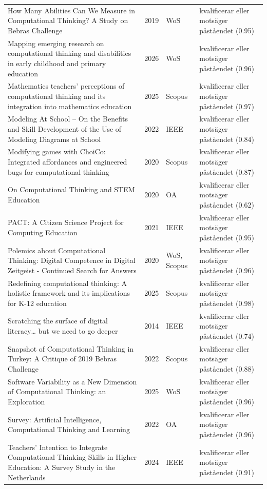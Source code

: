 \begin{longtable}{@{}%
  >{\raggedright\arraybackslash}p{}c%
  >{\raggedright\arraybackslash}p{}%
  >{\raggedright\arraybackslash}p{}@{}}
How Many Abilities Can We Measure in Computational Thinking? A Study on Bebras Challenge & 2019 & WoS & kvalificerar eller motsäger påståendet (0.95) \\
Mapping emerging research on computational thinking and disabilities in early childhood and primary education & 2026 & WoS & kvalificerar eller motsäger påståendet (0.96) \\
Mathematics teachers' perceptions of computational thinking and its integration into mathematics education & 2025 & Scopus & kvalificerar eller motsäger påståendet (0.97) \\
Modeling At School -- On the Benefits and Skill Development of the Use of Modeling Diagrams at School & 2022 & IEEE & kvalificerar eller motsäger påståendet (0.84) \\
Modifying games with ChoiCo: Integrated affordances and engineered bugs for computational thinking & 2020 & Scopus & kvalificerar eller motsäger påståendet (0.87) \\
On Computational Thinking and STEM Education & 2020 & OA & kvalificerar eller motsäger påståendet (0.62) \\
PACT: A Citizen Science Project for Computing Education & 2021 & IEEE & kvalificerar eller motsäger påståendet (0.95) \\
Polemics about Computational Thinking: Digital Competence in Digital Zeitgeist - Continued Search for Answers & 2020 & WoS, Scopus & kvalificerar eller motsäger påståendet (0.96) \\
Redefining computational thinking: A holistic framework and its implications for K-12 education & 2025 & Scopus & kvalificerar eller motsäger påståendet (0.98) \\
Scratching the surface of digital literacy\dots{} but we need to go deeper & 2014 & IEEE & kvalificerar eller motsäger påståendet (0.74) \\
Snapshot of Computational Thinking in Turkey: A Critique of 2019 Bebras Challenge & 2022 & Scopus & kvalificerar eller motsäger påståendet (0.88) \\
Software Variability as a New Dimension of Computational Thinking: an Exploration & 2025 & WoS & kvalificerar eller motsäger påståendet (0.96) \\
Survey: Artificial Intelligence, Computational Thinking and Learning & 2022 & OA & kvalificerar eller motsäger påståendet (0.96) \\
Teachers' Intention to Integrate Computational Thinking Skills in Higher Education: A Survey Study in the Netherlands & 2024 & IEEE & kvalificerar eller motsäger påståendet (0.91) \\

\end{longtable}
